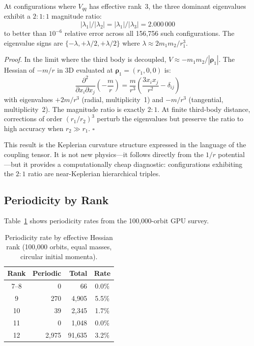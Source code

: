 \documentclass[aps,pre,twocolumn,superscriptaddress,floatfix]{revtex4-2}
\begin{document}
At configurations where $V_{qq}$ has effective rank~3, the three
dominant eigenvalues exhibit a $2{:}1{:}1$ magnitude ratio:
\begin{equation}
|\lambda_1| / |\lambda_2| = |\lambda_1| / |\lambda_3| = 2.000\,000
\label{eq:ratio}
\end{equation}
to better than $10^{-6}$ relative error across all 156{,}756 such
configurations. The eigenvalue signs are $\{-\lambda, +\lambda/2,
+\lambda/2\}$ where $\lambda \approx 2m_1 m_2 / r_1^3$.

\emph{Proof.} In the limit where the third body is decoupled,
$V \approx -m_1 m_2 / |\boldsymbol{\rho}_1|$. The Hessian of
$-m/r$ in 3D evaluated at $\boldsymbol{\rho}_1 = (r_1, 0, 0)$ is:
\[
\frac{\partial^2}{\partial x_i \partial x_j}\!\left(-\frac{m}{r}\right)
= \frac{m}{r^3}\!\left(\frac{3 x_i x_j}{r^2} - \delta_{ij}\right)
\]
with eigenvalues $+2m/r^3$ (radial, multiplicity~1) and $-m/r^3$
(tangential, multiplicity~2). The magnitude ratio is exactly $2{:}1$.
At finite third-body distance, corrections of order
$(r_1/r_2)^3$ perturb the eigenvalues but preserve the ratio to high
accuracy when $r_2 \gg r_1$. $\square$

This result is the Keplerian curvature structure expressed in the
language of the coupling tensor. It is not new physics---it follows
directly from the $1/r$ potential---but it provides a computationally
cheap diagnostic: configurations exhibiting the $2{:}1$ ratio are
near-Keplerian hierarchical triples.

\subsection{Periodicity by Rank}

Table~\ref{tab:orbits} shows periodicity rates from the 100{,}000-orbit
GPU survey.

\begin{table}[h]
\caption{Periodicity rate by effective Hessian rank (100{,}000 orbits,
equal masses, circular initial momenta).}
\label{tab:orbits}
\begin{ruledtabular}
\begin{tabular}{crrc}
Rank & Periodic & Total & Rate \\
\hline
7--8 & 0 & 66 & 0.0\% \\
9 & 270 & 4{,}905 & 5.5\% \\
10 & 39 & 2{,}345 & 1.7\% \\
11 & 0 & 1{,}048 & 0.0\% \\
12 & 2{,}975 & 91{,}635 & 3.2\% \\
\end{tabular}
\end{ruledtabular}
\end{table}
\end{document}
